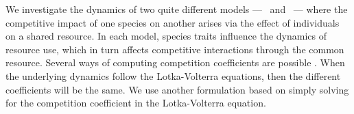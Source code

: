 \documentclass[a4paper,11pt]{article}
\begin{document}


We investigate the dynamics of two quite different models --- \plant\
and \Rstar\ --- where the competitive impact of one species on another
arises via the effect of individuals on a shared resource.
%
In each model, species traits influence the dynamics of resource use,
which in turn affects competitive interactions through the common
resource.  Several ways of computing competition coefficients are
possible \citep[e.g.,][]{Abrams-1987,Abrams-2008}.  When the
underlying dynamics follow the Lotka-Volterra equations, then the
different coefficients will be the same.  We use another formulation
based on simply solving for the competition coefficient in the
Lotka-Volterra equation.
\end{document}
